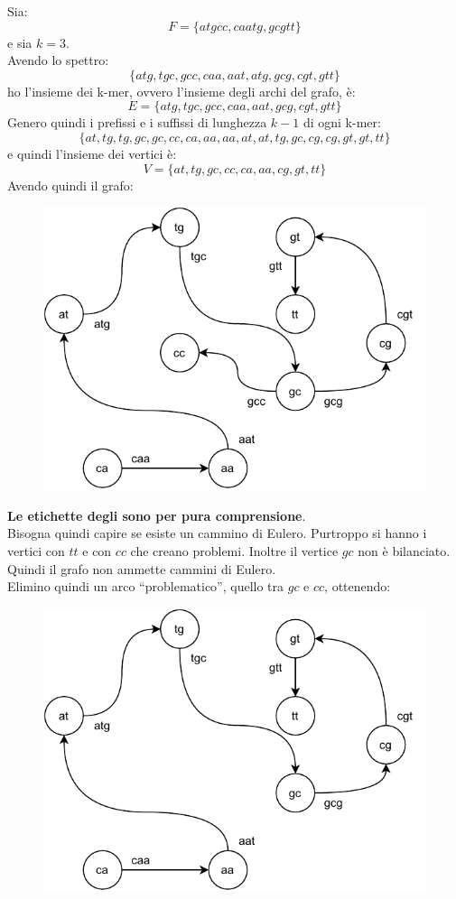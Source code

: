 \documentclass[a4paper,12pt, oneside]{book}
\begin{document}
\begin{esempio}
  Sia:
  \[F=\{atgcc, caatg, gcgtt\}\]
  e sia $k=3$.\\
  Avendo lo spettro:
  \[\{atg, tgc, gcc, caa, aat, atg, gcg, cgt, gtt\}\]
  ho l'insieme dei k-mer, ovvero l'insieme degli archi del grafo,  è:
  \[E=\{atg, tgc, gcc, caa, aat, gcg, cgt, gtt\}\]
  Genero quindi i prefissi e i suffissi di lunghezza $k-1$ di ogni k-mer:
  \[\{at,tg,tg,gc,gc,cc,ca,aa,aa,at,at,tg,gc,cg,cg,gt,gt,tt\}\]
  e quindi l'insieme dei vertici è:
  \[V=\{at,tg,gc,cc,ca,aa,cg,gt,tt\}\]
  Avendo quindi il grafo:
  \begin{figure}[H]
    \centering
    \includegraphics[scale = 1]{img/gra7.pdf}
  \end{figure}
  \textbf{Le etichette degli sono per pura comprensione}.\\
  Bisogna quindi capire se esiste un cammino di Eulero. Purtroppo si hanno i
  vertici con $tt$ e con $cc$ che creano problemi. Inoltre il vertice $gc$ non è
  bilanciato. Quindi il grafo non ammette cammini di Eulero.\\
  Elimino quindi un arco ``problematico'', quello tra $gc$ e $cc$, ottenendo:
  \begin{figure}[H]
    \centering
    \includegraphics[scale = 1]{img/gra8.pdf}

\end{figure}
\end{esempio}
\end{document}
